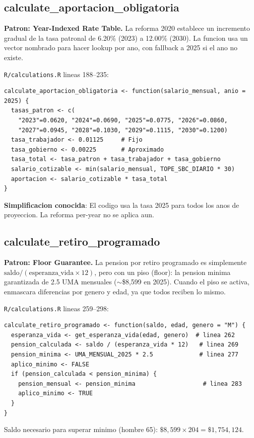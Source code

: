 \documentclass[11pt, letterpaper, twoside]{report}
\begin{document}
\subsection{calculate\_aportacion\_obligatoria}

\begin{patronbox}
\textbf{Patron: Year-Indexed Rate Table.} La reforma 2020 establece un incremento
gradual de la tasa patronal de 6.20\% (2023) a 12.00\% (2030). La funcion usa un
vector nombrado para hacer lookup por ano, con fallback a 2025 si el ano no existe.
\end{patronbox}

\begin{codigobox}
\texttt{R/calculations.R} lineas 188--235:
\begin{lstlisting}[caption={Tasas de aportacion con reforma 2020}]
calculate_aportacion_obligatoria <- function(salario_mensual, anio = 2025) {
  tasas_patron <- c(
    "2023"=0.0620, "2024"=0.0690, "2025"=0.0775, "2026"=0.0860,
    "2027"=0.0945, "2028"=0.1030, "2029"=0.1115, "2030"=0.1200)
  tasa_trabajador <- 0.01125     # Fijo
  tasa_gobierno <- 0.00225       # Aproximado
  tasa_total <- tasa_patron + tasa_trabajador + tasa_gobierno
  salario_cotizable <- min(salario_mensual, TOPE_SBC_DIARIO * 30)
  aportacion <- salario_cotizable * tasa_total
}
\end{lstlisting}
\textbf{Simplificacion conocida}: El codigo usa la tasa 2025 para todos los anos
de proyeccion. La reforma per-year no se aplica aun.
\end{codigobox}


\subsection{calculate\_retiro\_programado}

\begin{patronbox}
\textbf{Patron: Floor Guarantee.} La pension por retiro programado es simplemente
$\text{saldo} / (\text{esperanza\_vida} \times 12)$, pero con un piso (floor): la
pension minima garantizada de 2.5 UMA mensuales ($\sim$\$8,599 en 2025). Cuando
el piso se activa, enmascara diferencias por genero y edad, ya que todos reciben
lo mismo.
\end{patronbox}

\begin{codigobox}
\texttt{R/calculations.R} lineas 259--298:
\begin{lstlisting}[caption={Retiro programado con pension minima}]
calculate_retiro_programado <- function(saldo, edad, genero = "M") {
  esperanza_vida <- get_esperanza_vida(edad, genero)  # linea 262
  pension_calculada <- saldo / (esperanza_vida * 12)   # linea 269
  pension_minima <- UMA_MENSUAL_2025 * 2.5             # linea 277
  aplico_minimo <- FALSE
  if (pension_calculada < pension_minima) {
    pension_mensual <- pension_minima                   # linea 283
    aplico_minimo <- TRUE
  }
}
\end{lstlisting}
Saldo necesario para superar minimo (hombre 65): $\$8,599 \times 204 = \$1,754,124$.
\end{codigobox}
\end{document}
